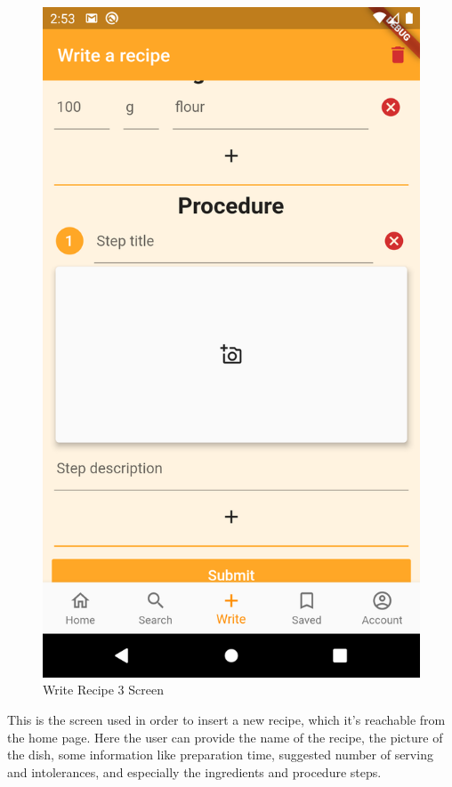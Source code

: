 \begin{figure}[H]
\begin{minipage}{0.31\textwidth}
		\includegraphics[width = .9\linewidth]{img/Write_3.png}
		\caption{Write Recipe 3 Screen}
	\end{minipage}
\end{figure}
This is the screen used in order to insert a new recipe, which it's reachable from the home page.
Here the user can provide the name of the recipe, the picture of the dish, some information like preparation time, suggested number of serving and intolerances, and especially the ingredients and procedure steps.

